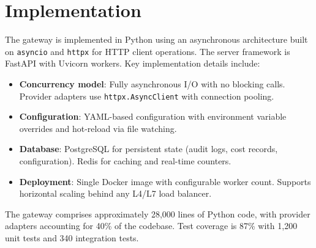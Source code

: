 \section{Implementation}

\label{sec:implementation}

The gateway is implemented in Python using an asynchronous architecture built on \texttt{asyncio} and \texttt{httpx} for HTTP client operations. The server framework is FastAPI with Uvicorn workers. Key implementation details include:

\begin{itemize}[leftmargin=*]
    \item \textbf{Concurrency model}: Fully asynchronous I/O with no blocking calls. Provider adapters use \texttt{httpx.AsyncClient} with connection pooling.
    \item \textbf{Configuration}: YAML-based configuration with environment variable overrides and hot-reload via file watching.
    \item \textbf{Database}: PostgreSQL for persistent state (audit logs, cost records, configuration). Redis for caching and real-time counters.
    \item \textbf{Deployment}: Single Docker image with configurable worker count. Supports horizontal scaling behind any L4/L7 load balancer.
\end{itemize}

The gateway comprises approximately 28,000 lines of Python code, with provider adapters accounting for 40\% of the codebase. Test coverage is 87\% with 1,200 unit tests and 340 integration tests.

